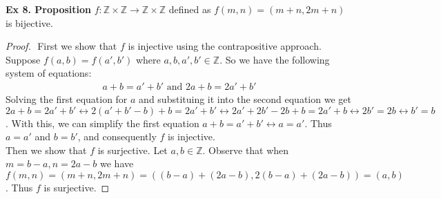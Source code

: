 \documentclass{article}
\begin{document}
\noindent\textbf{Ex 8. Proposition} $f: \mathbb{Z}\times\mathbb{Z} \rightarrow \mathbb{Z}\times\mathbb{Z}$ defined as $f(m, n)=(m+n, 2m+n)$ is bijective.
\begin{proof}
$ $\newline
First we show that $f$ is injective using the contrapositive approach. Suppose $f(a, b)=f(a', b')$ where $a, b, a', b' \in \mathbb{Z}$. So we have the following system of equations:
\begin{align*}
a + b = a' + b' \text{ and } 2a + b = 2a'+b'
\end{align*}
Solving the first equation for $a$ and substituing it into the second equation we get $2a+b=2a'+b' \leftrightarrow 2(a'+b'-b)+b=2a'+b' \leftrightarrow 2a'+2b'-2b+b=2a'+b \leftrightarrow 2b'=2b \leftrightarrow b' = b$. With this, we can simplify the first equation $a+b = a'+b' \leftrightarrow a=a'$. Thus $a=a'$ and $b=b'$, and consequently $f$ is injective.\\

\noindent Then we show that $f$ is surjective. Let $a,b \in \mathbb{Z}$. Observe that when $m=b-a,n=2a-b$ we have $f(m, n)= (m+n, 2m+n)=((b-a)+(2a-b), 2(b-a)+(2a-b))=(a, b)$. Thus $f$ is surjective.

\end{proof}
\end{document}
